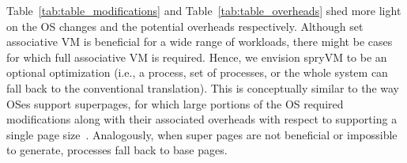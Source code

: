 Table~\ref{tab:table_modifications} and Table~\ref{tab:table_overheads} shed more light on the OS changes and the potential overheads respectively. Although set associative VM is beneficial for a wide range of workloads, there might be cases for which full associative VM is required. Hence, we envision spryVM to be an optional optimization (i.e., a process, set of processes, or the whole system can fall back to the conventional translation). This is conceptually similar to the way OSes support superpages, for which large portions of the OS required modifications along with their associated overheads with respect to supporting a single page size~\cite{talluri:surpassing, navarro:practical, kwon:coordinated}. Analogously, when super pages are not beneficial or impossible to generate, processes fall back to base pages. 
 





